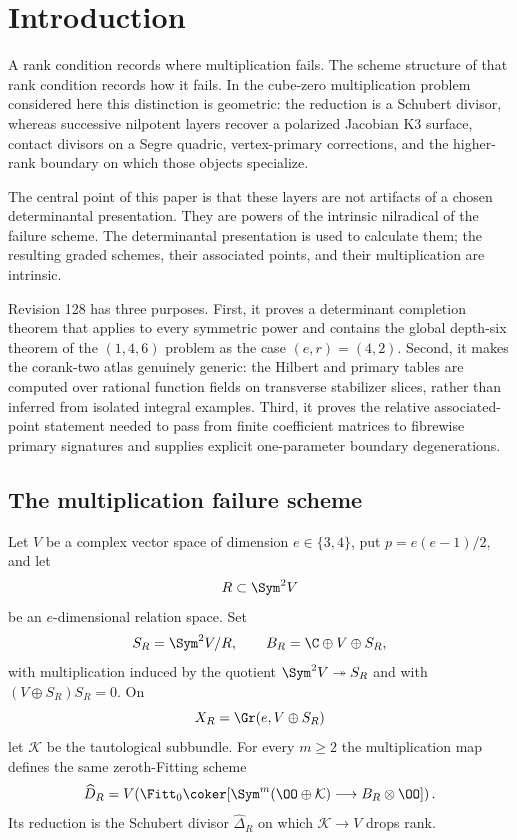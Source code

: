 \section{Introduction}
\label{sec:introduction-v128}

A rank condition records where multiplication fails.  The scheme
structure of that rank condition records how it fails.  In the
cube-zero multiplication problem considered here this distinction is
geometric: the reduction is a Schubert divisor, whereas successive
nilpotent layers recover a polarized Jacobian K3 surface, contact
divisors on a Segre quadric, vertex-primary corrections, and the
higher-rank boundary on which those objects specialize.

The central point of this paper is that these layers are not artifacts
of a chosen determinantal presentation.  They are powers of the
intrinsic nilradical of the failure scheme.  The determinantal
presentation is used to calculate them; the resulting graded schemes,
their associated points, and their multiplication are intrinsic.

Revision 128 has three purposes.  First, it proves a determinant
completion theorem that applies to every symmetric power and contains
the global depth-six theorem of the \((1,4,6)\) problem as the case
\((e,r)=(4,2)\).  Second, it makes the corank-two atlas genuinely
generic: the Hilbert and primary tables are computed over rational
function fields on transverse stabilizer slices, rather than inferred
from isolated integral examples.  Third, it proves the relative
associated-point statement needed to pass from finite coefficient
matrices to fibrewise primary signatures and supplies explicit
one-parameter boundary degenerations.

\subsection{The multiplication failure scheme}

Let \(V\) be a complex vector space of dimension
\(e\in\{3,4\}\), put \(p=e(e-1)/2\), and let
\[
 R\subset\Sym^2V
\]
be an \(e\)-dimensional relation space.  Set
\[
 S_R=\Sym^2V/R,\qquad
 B_R=\C\oplus V\oplus S_R,
\]
with multiplication induced by the quotient
\(\Sym^2V\twoheadrightarrow S_R\) and with
\((V\oplus S_R)S_R=0\).  On
\[
 X_R=\Gr(e,V\oplus S_R)
\]
let \(\mathcal K\) be the tautological subbundle.  For every
\(m\ge2\) the multiplication map defines the same zeroth-Fitting
scheme
\begin{equation}\label{eq:failure-intro}
 \widehat D_R=
 V\!\left(
 \Fitt_0\coker[
 \Sym^m(\OO\oplus\mathcal K)\longrightarrow
 B_R\otimes\OO]\right).
\end{equation}
Its reduction is the Schubert divisor
\(\widehat\Delta_R\) on which \(\mathcal K\to V\) drops rank.

